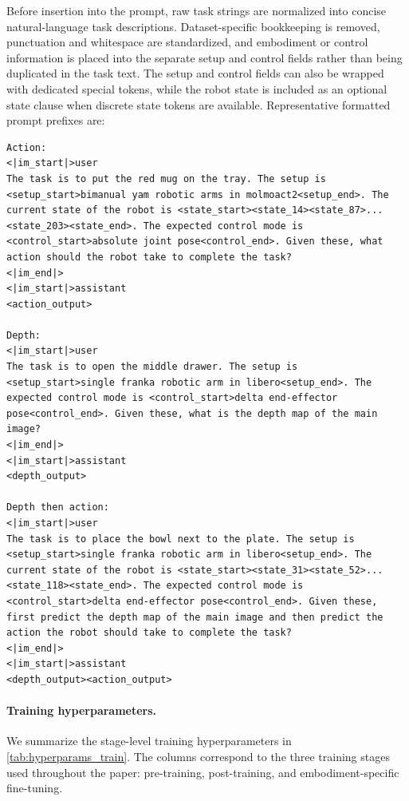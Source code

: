 Before insertion into the prompt, raw task strings are normalized into concise
natural-language task descriptions. Dataset-specific bookkeeping is removed,
punctuation and whitespace are standardized, and embodiment or control
information is placed into the separate setup and control fields rather than
being duplicated in the task text. The setup and control fields can also be
wrapped with dedicated special tokens, while the robot state is included as an
optional state clause when discrete state tokens are available. Representative
formatted prompt prefixes are:

\begin{center}
\begin{minipage}{0.88\linewidth}
\begin{lstlisting}[basicstyle=\ttfamily\footnotesize,breaklines=true,frame=single,framerule=0.4pt]
Action:
<|im_start|>user
The task is to put the red mug on the tray. The setup is <setup_start>bimanual yam robotic arms in molmoact2<setup_end>. The current state of the robot is <state_start><state_14><state_87>...<state_203><state_end>. The expected control mode is <control_start>absolute joint pose<control_end>. Given these, what action should the robot take to complete the task?
<|im_end|>
<|im_start|>assistant
<action_output>

Depth:
<|im_start|>user
The task is to open the middle drawer. The setup is <setup_start>single franka robotic arm in libero<setup_end>. The expected control mode is <control_start>delta end-effector pose<control_end>. Given these, what is the depth map of the main image?
<|im_end|>
<|im_start|>assistant
<depth_output>

Depth then action:
<|im_start|>user
The task is to place the bowl next to the plate. The setup is <setup_start>single franka robotic arm in libero<setup_end>. The current state of the robot is <state_start><state_31><state_52>...<state_118><state_end>. The expected control mode is <control_start>delta end-effector pose<control_end>. Given these, first predict the depth map of the main image and then predict the action the robot should take to complete the task?
<|im_end|>
<|im_start|>assistant
<depth_output><action_output>
\end{lstlisting}
\end{minipage}
\end{center}

\paragraph{Training hyperparameters.}
We summarize the stage-level training hyperparameters in
\autoref{tab:hyperparams_train}. The columns correspond to the three training
stages used throughout the paper: pre-training, post-training, and
embodiment-specific fine-tuning.

